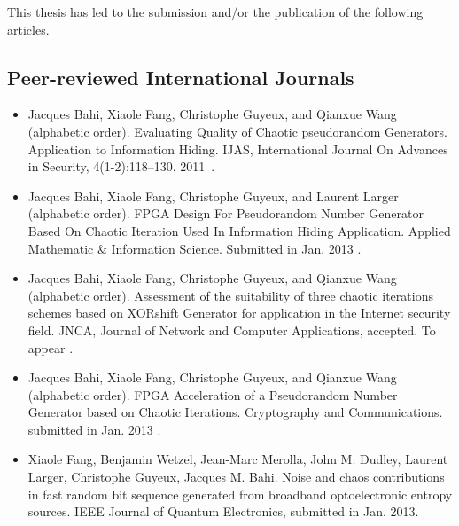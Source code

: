 This thesis has led to the submission and/or the publication of the following articles.
\subsection{Peer-reviewed International Journals}
\begin{itemize}
\item Jacques Bahi, Xiaole Fang, Christophe Guyeux, and Qianxue Wang (alphabetic order). Evaluating Quality of Chaotic pseudorandom Generators. Application to Information Hiding. IJAS, International Journal On Advances in Security, 4(1-2):118--130. 2011~\cite{bfgw11:ij}.
\end{itemize}

\begin{itemize}
\item Jacques Bahi, Xiaole Fang, Christophe Guyeux, and Laurent Larger (alphabetic order). FPGA Design For Pseudorandom Number Generator Based On Chaotic Iteration Used In Information Hiding Application. Applied Mathematic \& Information Science. Submitted in Jan. 2013 \cite{submit1}.
\end{itemize}

\begin{itemize}
\item Jacques Bahi, Xiaole Fang, Christophe Guyeux, and Qianxue Wang (alphabetic order). Assessment of the suitability of three chaotic iterations schemes based on XORshift Generator for application in the Internet security field. JNCA, Journal of Network and Computer Applications, accepted. To appear \cite{submit2}.
\end{itemize}

\begin{itemize}
\item Jacques Bahi, Xiaole Fang, Christophe Guyeux, and Qianxue Wang (alphabetic order). FPGA Acceleration of a Pseudorandom Number Generator based on Chaotic Iterations. Cryptography and Communications. submitted in Jan. 2013 \cite{submit3}.
\end{itemize}

\begin{itemize}
 \item Xiaole Fang, Benjamin Wetzel, Jean-Marc
    Merolla, John M. Dudley, Laurent Larger, Christophe Guyeux,
    Jacques M. Bahi. Noise and chaos contributions in fast random bit sequence generated from broadband optoelectronic entropy sources.  IEEE Journal of Quantum Electronics, submitted in Jan. 2013\cite{submit4}.
\end{itemize}



